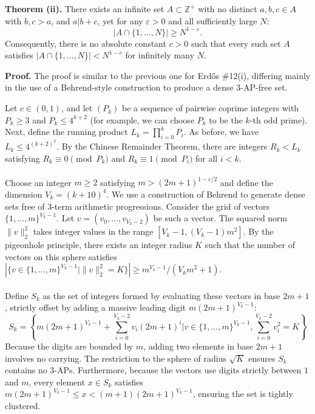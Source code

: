 \noindent \textbf{Theorem \upshape(ii).} There exists an infinite set $A \subset \mathbb{Z}^+$ with no distinct $a, b, c \in A$ with $b, c > a$, and $a | b + c$, yet for any $\varepsilon > 0$ and all sufficiently large $N$:
    $$ |A \cap \{1, \dots, N\}| \geq N^{1-\varepsilon}.$$
    Consequently, there is no absolute constant $c > 0$ such that every such set $A$ satisfies $|A \cap \{1, \dots, N\}| < N^{1-c}$ for infinitely many $N$.
    
\noindent \textbf{Proof.} 
The proof is similar to the previous one for Erd\H{o}s \#12(i), differing mainly in the use of a Behrend-style construction to produce a dense 3-AP-free set.

Let $c \in (0, 1)$, and let $(P_k)$ be a sequence of pairwise coprime integers with $P_k \geq 3$ and $P_k \leq 4^{k+2}$ (for example, we can choose $P_k$ to be the $k$-th odd prime). Next, define the running product $L_k = \prod_{i = 0}^k P_i$. As before, we have $L_k \leq 4^{(k+2)^2}$. By the Chinese Remainder Theorem, there are integers $R_k < L_k$ satisfying $R_k \equiv 0 \pmod{P_k}$ and $R_k \equiv 1 \pmod{P_i}$ for all $i < k$.
\\\\
Choose an integer $m \geq 2$ satisfying $m > (2m + 1)^{1-c/2}$ and define the dimension $V_k = (k + 10)^4$. We use a construction of Behrend to generate dense sets free of 3-term arithmetic progressions. Consider the grid of vectors $\{1, \dots, m\}^{V_k - 1}$. Let $v = (v_0, \dots, v_{V_k - 2})$ be such a vector. The squared norm $\|v\|_2^2$ takes integer values in the range $[V_k - 1, (V_k - 1) m^2]$. By the pigeonhole principle, there exists an integer radius $K$ such that the number of vectors on this sphere satisfies $|\{v \in \{1, \dots, m\}^{V_k - 1} \mid \|v\|_2^2 = K\}| \geq m^{V_k - 1} / (V_k m^2 + 1)$.
\\\\
Define $S_k$ as the set of integers formed by evaluating these vectors in base $2m+1$, strictly offset by adding a massive leading digit $m(2m+1)^{V_k - 1}$:
$$S_k = \left\{ m(2m+1)^{V_k - 1} + \sum_{i = 0}^{V_k - 2} v_i (2m + 1)^i \mathrel{\Bigg|} v \in \{1, \dots, m\}^{V_k - 1}, \sum_{i=0}^{V_k-2} v_i^2 = K \right\}$$
Because the digits are bounded by $m$, adding two elements in base $2m+1$ involves no carrying. The restriction to the sphere of radius $\sqrt{K}$ ensures $S_k$ contains no 3-APs. Furthermore, because the vectors use digits strictly between $1$ and $m$, every element $x \in S_k$ satisfies $m(2m+1)^{V_k-1} \leq x < (m+1)(2m+1)^{V_k-1}$, ensuring the set is tightly clustered.
